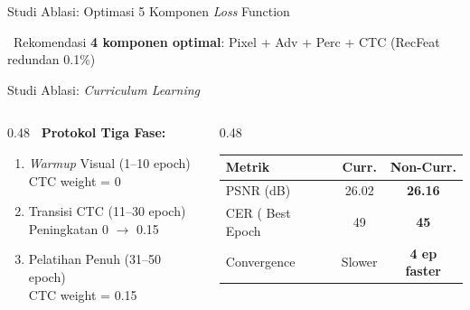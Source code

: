 \documentclass[aspectratio=169,10pt,t]{beamer}
\begin{document}
\begin{frame}[shrink=5]{Studi Ablasi: Optimasi 5 Komponen \textit{Loss} Function}
    \vspace{0.2em}
    \begin{alertblock}{\faWrench~Rekomendasi}
        \small
        \textbf{4 komponen optimal}: Pixel + Adv + Perc + CTC (RecFeat redundan 0.1\%)
    \end{alertblock}
\end{frame}

\begin{frame}{Studi Ablasi: \textit{Curriculum Learning}}
    \begin{columns}[T]
        \begin{column}{0.48\textwidth}
            \textbf{\faGraduationCap~Protokol Tiga Fase:}
            \begin{enumerate}\small
                \item \textit{Warmup} Visual (1--10 epoch)\\
                      CTC weight = 0
                \item Transisi CTC (11--30 epoch)\\
                      Peningkatan 0 $\rightarrow$ 0.15
                \item Pelatihan Penuh (31--50 epoch)\\
                      CTC weight = 0.15
            \end{enumerate}
        \end{column}
        \begin{column}{0.48\textwidth}
            \begin{table}
                \scriptsize
                \begin{tabular}{lcc}
                    \toprule
                    \textbf{Metrik} & \textbf{Curr.} & \textbf{Non-Curr.} \\
                    \midrule
                    PSNR (dB) & 26.02 & \textbf{26.16} \\
                    CER (%
                    Best Epoch & 49 & \textbf{45} \\
                    Convergence & Slower & \textbf{4 ep faster} \\
                    \bottomrule
                \end{tabular}
            \end{table}
        \end{column}
    \end{columns}
    

\end{frame}
\end{document}
